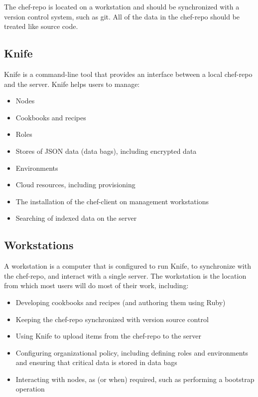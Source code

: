 The chef-repo is located on a workstation and should be synchronized with a version control system, such as git. All of the data in the chef-repo should be treated like source code.

\subsection{Knife}

Knife is a command-line tool that provides an interface between a local chef-repo and the server. Knife helps users to manage:

\begin{itemize}
  \item Nodes
  \item Cookbooks and recipes
  \item Roles
  \item Stores of JSON data (data bags), including encrypted data
  \item Environments
  \item Cloud resources, including provisioning
  \item The installation of the chef-client on management workstations
  \item Searching of indexed data on the server
\end{itemize}

\subsection{Workstations}

A workstation is a computer that is configured to run Knife, to synchronize with the chef-repo, and interact with a single server. The workstation is the location from which most users will do most of their work, including:

\begin{itemize}
  \item Developing cookbooks and recipes (and authoring them using Ruby)
  \item Keeping the chef-repo synchronized with version source control
  \item Using Knife to upload items from the chef-repo to the server
  \item Configuring organizational policy, including defining roles and environments and ensuring that critical data is stored in data bags
  \item Interacting with nodes, as (or when) required, such as performing a bootstrap operation
\end{itemize}

